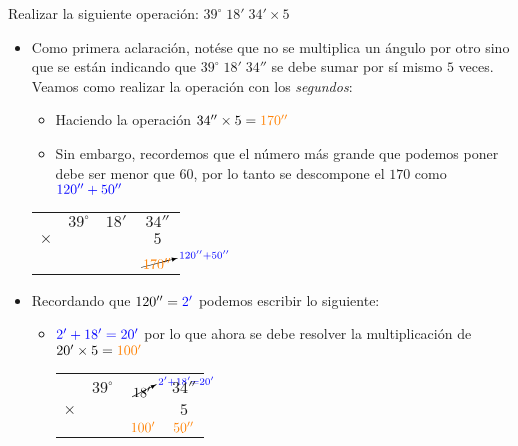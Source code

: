 \begin{example}
	Realizar la siguiente operación: $39^\circ\; 18'\; 34' \times 5$
	\begin{itemize}
		\item Como primera aclaración, notése que no se multiplica un ángulo por 
		otro sino que se están indicando que $39^\circ\; 18'\; 34''$ se debe 
		sumar por sí mismo $5$ veces. \\
		Veamos como realizar la operación con los \textit{segundos}:

		\begin{itemize}
			\item Haciendo la operación $34'' \times 5 = \textcolor{orange}{170''}$
			\item Sin embargo, recordemos que el número más grande que podemos poner 
			debe ser menor que $60$, por lo tanto se descompone el $170$ como 
			$\textcolor{blue}{120'' + 50''}$
		\end{itemize}

		\begin{center}
			\setlength{\extrarowheight}{12pt}
			\begin{tabular}{ c c c c}
					& $39^\circ$ & $18'$ & $34''$ \\
				$\times$ &   &  & $5$ \\
				\hline
				&  &   &  
				$\cancelto{\textcolor{blue}{120'' + 50''}}{\textcolor{orange}{170''}}$
			\end{tabular}
		\end{center}		

		\item Recordando que $120'' = \textcolor{blue}{2'}$ podemos escribir lo 
		siguiente:

		\begin{itemize}
			\item $\textcolor{blue}{2' + 18' = 20'}$ por lo que ahora se debe resolver 
			la multiplicación
			de $20' \times 5 = \textcolor{orange}{100'}$
		

			\begin{center}
				\begin{tabular}{ c c c c}
						& $39^\circ$ & $\cancelto{\textcolor{blue}{2' + 18' = 20'}}{18'}$ & 
						$34''$ \\
					$\times$ &   &  & $5$ \\
					\hline
					&  & 
					$\textcolor{orange}{100'}$  &  
					$\textcolor{orange}{50''}$
				\end{tabular}
			\end{center}	


\end{itemize}
\end{itemize}
\end{example}
